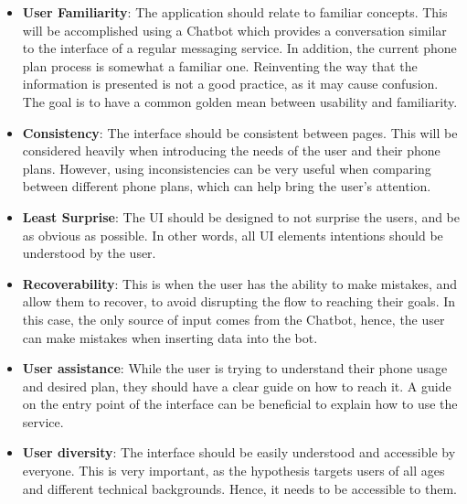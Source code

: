 \documentclass[conference]{IEEEtran}
\begin{document}
\begin{itemize}
    \item \textbf{User Familiarity}: The application should relate to familiar concepts. This will be accomplished using a Chatbot which provides a conversation similar to the interface of a regular messaging service. In addition, the current phone plan process is somewhat a familiar one. Reinventing the way that the information is presented is not a good practice, as it may cause confusion. The goal is to have a common golden mean between usability and familiarity.
    \item \textbf{Consistency}: The interface should be consistent between pages. This will be considered heavily when introducing the needs of the user and their phone plans. However, using inconsistencies can be very useful when comparing between different phone plans, which can help bring the user's attention.
    \item \textbf{Least Surprise}: The UI should be designed to not surprise the users, and be as obvious as possible. In other words, all UI elements intentions should be understood by the user.
    \item \textbf{Recoverability}: This is when the user has the ability to make mistakes, and allow them to recover, to avoid disrupting the flow to reaching their goals. In this case, the only source of input comes from the Chatbot, hence, the user can make mistakes when inserting data into the bot. 
    \item \textbf{User assistance}: While the user is trying to understand their phone usage and desired plan, they should have a clear guide on how to reach it. A guide on the entry point of the interface can be beneficial to explain how to use the service. 
    \item \textbf{User diversity}: The interface should be easily understood and accessible by everyone. This is very important, as the hypothesis targets users of all ages and different technical backgrounds. Hence, it needs to be accessible to them.
\end{itemize}
\end{document}
